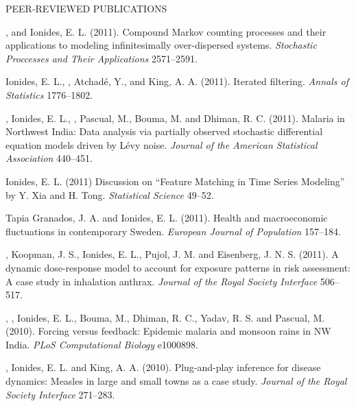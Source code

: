 \begin{reflist}{PEER-REVIEWED PUBLICATIONS}
\item\formal{[[\bretoSPA] ]}
 , and Ionides, E. L. (2011). Compound Markov counting processes and their applications to modeling infinitesimally over-dispersed systems. {\em Stochastic Proccesses and Their Applications} {}{\separator}2571--2591.

\item\formal{[[\ionidesAOS] ]}
 Ionides, E. L., , Atchad\'{e}, Y., and King, A. A. (2011). Iterated filtering. {\em Annals of Statistics} {}{\separator}1776--1802.

\item\formal{[[\bhadraJASA] ]} , Ionides, E. L., , Pascual, M., Bouma, M. and Dhiman, R. C. (2011).
Malaria in Northwest India: Data analysis via partially observed stochastic differential equation models driven by L\'{e}vy noise. {\em Journal of the American Statistical Association} {}{\separator}440--451.

\item\formal{[[\ionidesSTATSCI] ]} Ionides, E. L. (2011) Discussion on ``Feature Matching in Time Series Modeling'' by Y. Xia and H. Tong.  {\em Statistical Science} {}{\separator}49--52.

\item\formal{[[\tapiaEJP] ]} Tapia Granados, J. A. and Ionides, E. L. (2011). Health and macroeconomic fluctuations in contemporary Sweden. {\em European Journal of Population} {}{\separator}157--184.



\item\formal{[[\mayerJRSI] ]} , Koopman, J. S., Ionides, E. L., Pujol, J. M. and  Eisenberg, J. N. S. (2011). A dynamic dose-response model to account for exposure patterns in risk assessment: A case study in inhalation anthrax. {\em Journal of the Royal Society Interface} {}{\separator}506--517.


\item\formal{[[\laneriPLOSCB] ]} , , Ionides, E. L., Bouma, M., Dhiman, R. C., Yadav, R. S. and Pascual, M. (2010).  Forcing versus feedback: Epidemic malaria and monsoon rains in NW India. {\em PLoS Computational Biology} {}{\separator}e1000898.

\item\formal{[[\heJRSI] ]}
, Ionides, E. L. and King, A. A. (2010).
Plug-and-play inference for disease dynamics: Measles in large and small towns as a case study. {\em Journal of the Royal Society Interface} {}{\separator}271--283.



\end{reflist}
